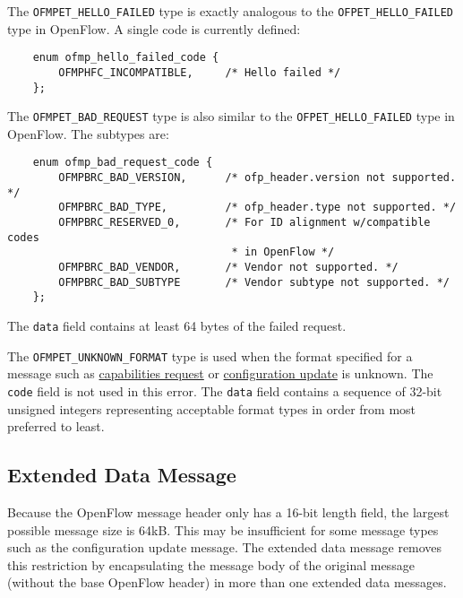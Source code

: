 \documentclass[11pt,a4paper]{article}
\begin{document}
    The \verb|OFMPET_HELLO_FAILED| type is exactly analogous to the
    \verb|OFPET_HELLO_FAILED| type in OpenFlow.  A single code is currently
    defined:

{ \footnotesize

\begin{verbatim}
    enum ofmp_hello_failed_code {
        OFMPHFC_INCOMPATIBLE,     /* Hello failed */
    };

\end{verbatim}


}

    The \verb|OFMPET_BAD_REQUEST| type is also similar to the
    \verb|OFPET_HELLO_FAILED| type in OpenFlow.  The subtypes are:

{ \footnotesize

\begin{verbatim}
    enum ofmp_bad_request_code {
        OFMPBRC_BAD_VERSION,      /* ofp_header.version not supported. */
        OFMPBRC_BAD_TYPE,         /* ofp_header.type not supported. */
        OFMPBRC_RESERVED_0,       /* For ID alignment w/compatible codes
                                   * in OpenFlow */
        OFMPBRC_BAD_VENDOR,       /* Vendor not supported. */
        OFMPBRC_BAD_SUBTYPE       /* Vendor subtype not supported. */
    };

\end{verbatim}


}

    The \verb|data| field contains at least 64 bytes of the failed request.

    The \verb|OFMPET_UNKNOWN_FORMAT| type is used when the format specified
    for a message such as \hyperref[sec-2.8.2]{capabilities request} or
    \hyperref[sec-2.8.4]{configuration update} is unknown.  The \verb|code| field is not used in
    this error.  The \verb|data| field contains a sequence of 32-bit
    unsigned integers representing acceptable format types in order
    from most preferred to least.

\subsection{Extended Data Message}
\label{sec-2.7}


   Because the OpenFlow message header only has a 16-bit length field,
   the largest possible message size is 64kB.  This may be
   insufficient for some message types such as the configuration
   update message.  The extended data message removes this restriction
   by encapsulating the message body of the original message (without
   the base OpenFlow header) in more than one extended data messages.
\end{document}
